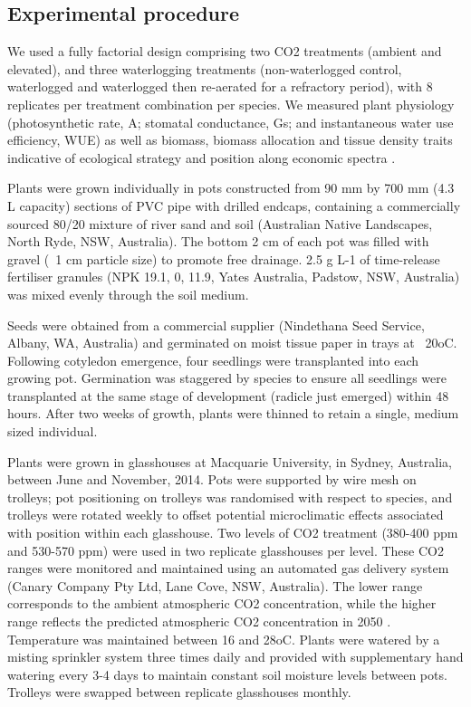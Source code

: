 \documentclass[12pt,a4paper]{memoir}
\begin{document}
\subsection*{Experimental procedure}
We used a fully factorial design comprising two CO2 treatments (ambient and elevated), and three waterlogging treatments (non-waterlogged control, waterlogged and waterlogged then re-aerated for a refractory period), with 8 replicates per treatment combination per species. We measured plant physiology (photosynthetic rate, A; stomatal conductance, Gs; and instantaneous water use efficiency, WUE) as well as biomass, biomass allocation and tissue density traits indicative of ecological strategy and position along economic spectra \citep{Reich2014}.

Plants were grown individually in pots constructed from 90 mm by 700 mm (4.3 L capacity) sections of PVC pipe with drilled endcaps, containing a commercially sourced 80/20 mixture of river sand and soil (Australian Native Landscapes, North Ryde, NSW, Australia). The bottom 2 cm of each pot was filled with gravel (~1 cm particle size) to promote free drainage. 2.5 g L-1 of time-release fertiliser granules (NPK 19.1, 0, 11.9, Yates Australia, Padstow, NSW, Australia) was mixed evenly through the soil medium.

Seeds were obtained from a commercial supplier (Nindethana Seed Service, Albany, WA, Australia) and germinated on moist tissue paper in trays at ~20oC. Following cotyledon emergence, four seedlings were transplanted into each growing pot. Germination was staggered by species to ensure all seedlings were transplanted at the same stage of development (radicle just emerged) within 48 hours. After two weeks of growth, plants were thinned to retain a single, medium sized individual.

Plants were grown in glasshouses at Macquarie University, in Sydney, Australia, between June and November, 2014. Pots were supported by wire mesh on trolleys; pot positioning on trolleys was randomised with respect to species, and trolleys were rotated weekly to offset potential microclimatic effects associated with position within each glasshouse. Two levels of CO2 treatment (380-400 ppm and 530-570 ppm) were used in two replicate glasshouses per level. These CO2 ranges were monitored and maintained using an automated gas delivery system (Canary Company Pty Ltd, Lane Cove, NSW, Australia). The lower range corresponds to the ambient atmospheric CO2 concentration, while the higher range reflects the predicted atmospheric CO2 concentration in 2050 \citep{IPCC2014}. Temperature was maintained between 16 and 28oC. Plants were watered by a misting sprinkler system three times daily and provided with supplementary hand watering every 3-4 days to maintain constant soil moisture levels between pots. Trolleys were swapped between replicate glasshouses monthly.
\end{document}
